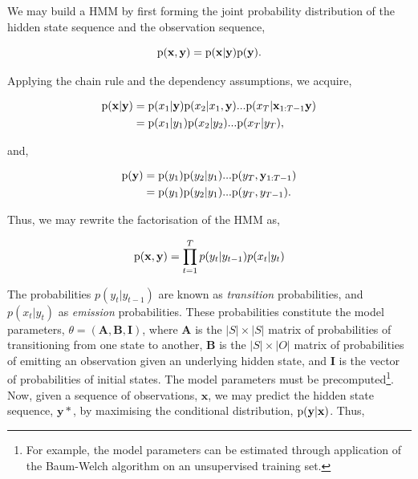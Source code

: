 We may build a HMM by first forming the joint probability distribution of the hidden state sequence and the observation sequence,

\begin{equation}
\text{p}(\mathbf{x}, \mathbf{y}) = \text{p}(\mathbf{x} | \mathbf{y}) \text{p}(\mathbf{y}).
\label{eq:joint}
\end{equation}

Applying the chain rule and the dependency assumptions, we acquire,

\begin{equation}
\begin{aligned}
\text{p}(\mathbf{x} | \mathbf{y}) &= \text{p}(x_1|\mathbf{y}) \text{p}(x_2|x_1, \mathbf{y}) ... \text{p}(x_T|\mathbf{x}_{1:T-1}\mathbf{y}) \\
&= \text{p}(x_1|y_1) \text{p}(x_2|y_2) ... \text{p}(x_T|y_T),
\end{aligned}
\label{eq:conditional}
\end{equation}

and,

\begin{equation}
\begin{aligned}
\text{p}(\mathbf{y}) &= \text{p}(y_1) \text{p}(y_2|y_1) ... \text{p}(y_T, \mathbf{y}_{1:T-1}) \\
&= \text{p}(y_1) \text{p}(y_2|y_1) ... \text{p}(y_T, y_{T-1}).
\end{aligned}
\label{eq:prior}
\end{equation}

Thus, we may rewrite the factorisation of the HMM as,

\begin{equation}
\text{p}(\mathbf{x}, \mathbf{y}) = \prod_{t=1}^T p(y_t | y_{t-1})p(x_t | y_t)
\label{eq:factorisedHMM}
\end{equation}

The probabilities $p(y_t | y_{t-1})$ are known as \emph{transition} probabilities, and $p(x_t | y_t) $ as \emph{emission} probabilities. These probabilities constitute the model parameters, $\theta = (\mathbf{A}, \mathbf{B}, \mathbf{I})$, where $\mathbf{A}$ is the $|S| \times |S|$ matrix of probabilities of transitioning from one state to another, $\mathbf{B}$ is the $|S| \times |O|$ matrix of probabilities of emitting an observation given an underlying hidden state, and $\mathbf{I}$ is the vector of probabilities of initial states. The model parameters must be precomputed\footnote{For example, the model parameters can be estimated through application of the Baum-Welch algorithm on an unsupervised training set.}. Now, given a sequence of observations, $\textbf{x}$, we may predict the hidden state sequence, $\mathbf{y}*$, by maximising the conditional distribution, $\text{p}(\mathbf{y} | \mathbf{x})$. Thus,

